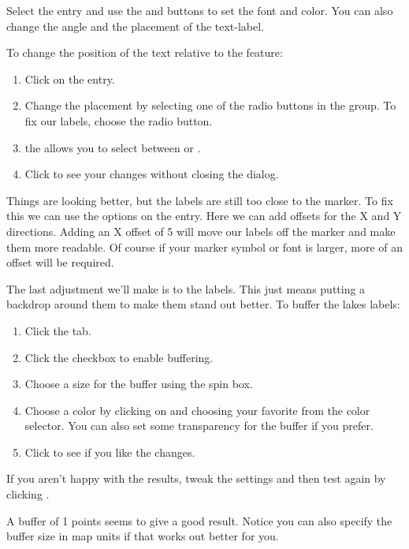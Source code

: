 Select the  entry and use the  and 
buttons to set the font and color. You can also change the angle and the
placement of the text-label.

To change the position of the text relative to the feature:

\begin{enumerate} 
\item Click on the  entry.
\item Change the placement by selecting one of the radio buttons
in the  group. To fix our labels, choose the
 radio button.
\item the  allows you to select between
 or .
\item Click  to see your changes without closing the dialog.
\end{enumerate} 

Things are looking better, but the labels are still too close to the marker. To
fix this we can use the options on the  entry. Here we can add
offsets for the X and Y directions. Adding an X offset of 5 will move our
labels off the marker and make them more readable. Of course if your marker
symbol or font is larger, more of an offset will be required.

The last adjustment we'll make is to  the labels. This just means
putting a backdrop around them to make them stand out better. To buffer the
lakes labels:

\begin{enumerate}
\item Click the  tab.
\item Click the  checkbox to enable buffering.
\item Choose a size for the buffer using the spin box.
\item Choose a color by clicking on  and choosing your
  favorite from the color selector. You can also set some transparency for the
  buffer if you prefer.
\item Click  to see if you like the changes.
\end{enumerate} 

If you aren't happy with the results, tweak the settings and then test again
by clicking .

A buffer of 1 points seems to give a good result.
Notice you can also specify the buffer size in map units if that works out
better for you.

